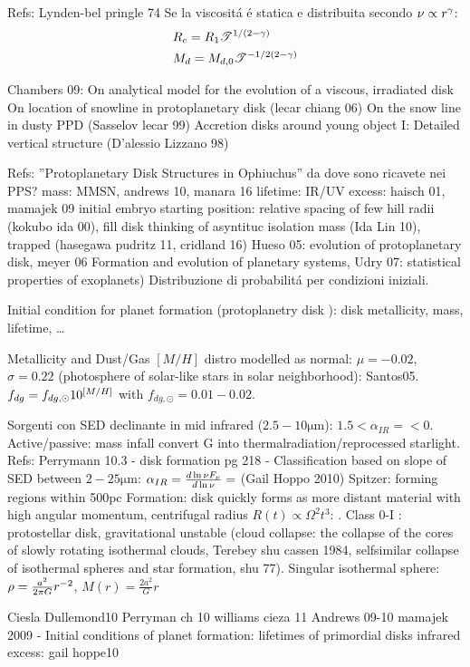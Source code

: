 \begin{workout}
	Refs: Lynden-bel pringle 74
	Se la viscosit\'a \'e statica e distribuita secondo $\nu\propto r^{\gamma}$:
	\begin{align}
	&R_c=R_1\mathcal{T}^{1/(2-\gamma)}\\
	&M_d=M_{d,0}\mathcal{T}^{-1/2(2-\gamma)}\\
	\end{align}
\end{workout}

\begin{workout}
	Chambers 09: On analytical model for the evolution of a viscous, irradiated disk
	On location of snowline in protoplanetary disk (lecar chiang 06)
	On the snow line in dusty PPD (Sasselov lecar 99)
	Accretion disks around young object I: Detailed vertical structure (D'alessio Lizzano 98)
\end{workout}

\begin{workout}
	Refs: ''Protoplanetary Disk Structures in Ophiuchus''
	da dove sono ricavete nei PPS?
	mass: MMSN, andrews 10, manara 16
	lifetime: IR/UV excess: haisch 01, mamajek 09
	initial embryo starting position: relative spacing of few hill radii (kokubo ida 00), fill disk thinking of asyntituc isolation mass (Ida Lin 10), trapped (hasegawa pudritz 11, cridland 16)
	Hueso 05: evolution of protoplanetary disk, meyer 06 Formation and evolution of planetary systems, Udry 07: statistical properties of exoplanets)
	Distribuzione di probabilit\'a per condizioni iniziali.
	
	Initial condition for planet formation (protoplanetry disk \cite{meyer2006formation}): disk metallicity, mass, lifetime, \ldots
	
	{Metallicity and Dust/Gas}
	$[M/H]$ distro modelled as normal: $\mu=-0.02$, $\sigma=0.22$ (photosphere of solar-like stars in solar neighborhood): Santos05.
	$f_{dg}=f_{dg,\odot}10^{[M/H]}$ with $f_{dg,\odot}=0.01-0.02$.
\end{workout}

\begin{workout}
	Sorgenti con SED declinante in mid infrared ($2.5-10\si{\micro\meter}$): $1.5<\alpha_{IR}=<0$. Active/passive: mass infall convert G into thermalradiation/reprocessed starlight.
	Refs: Perrymann 10.3 - disk formation pg 218 - 
	Classification based on slope of SED between $2-25\si{\micro\meter}$: $\alpha_{IR}=\frac{d \ln{\nu F_{\nu}}}{d \ln{\nu}}=$ (Gail Hoppo 2010)
	Spitzer: forming regions within 500pc
	Formation: disk quickly forms as more distant material with high angular momentum, centrifugal radius $R(t)\propto\Omega^2 t^3$: . Class 0-I : protostellar disk, gravitational unstable (cloud collapse: the collapse of the cores of slowly rotating isothermal clouds, Terebey shu cassen 1984, selfsimilar collapse of isothermal spheres and star formation, shu 77). Singular isothermal sphere: $\rho=\frac{a^2}{2\pi G}r^{-2}$, $M(r)=\frac{2a^2}{G}r$
\end{workout}

\begin{workout}
	Ciesla Dullemond10 
	Perryman ch 10
	williams cieza 11
	Andrews 09-10
	mamajek 2009 - Initial conditions of planet formation: lifetimes of primordial disks
	infrared excess: gail hoppe10
\end{workout}

